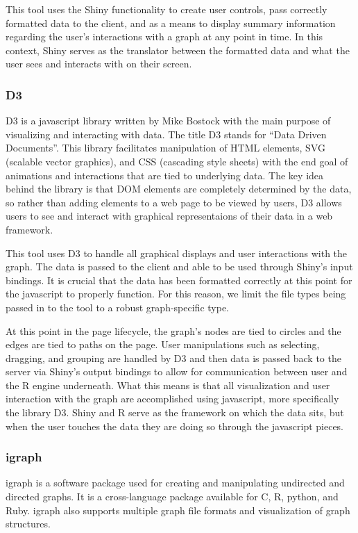 \documentclass{article}\usepackage{graphicx, color}
\begin{document}
This tool uses the Shiny functionality to create user controls, pass correctly formatted data to the client, and as a means to display summary information regarding the user's interactions with a graph at any point in time. In this context, Shiny serves as the translator between the formatted data and what the user sees and interacts with on their screen.


\subsubsection{D3}
D3 is a javascript library written by Mike Bostock with the main purpose of visualizing and interacting with data.\cite{mb-d3} The title D3 stands for ``Data Driven Documents”. This library facilitates manipulation of HTML elements, SVG (scalable vector graphics), and CSS (cascading style sheets) with the end goal of animations and interactions that are tied to underlying data. The key idea behind the library is that DOM elements are completely determined by the data, so rather than adding elements to a web page to be viewed by users, D3 allows users to see and interact with graphical representaions of their data in a web framework. 

This tool uses D3 to handle all graphical displays and user interactions with the graph. The data is passed to the client and able to be used through Shiny's input bindings. It is crucial that the data has been formatted correctly at this point for the javascript to properly function. For this reason, we limit the file types being passed in to the tool to a robust graph-specific type.

At this point in the page lifecycle, the graph's nodes are tied to circles and the edges are tied to paths on the page. User manipulations such as selecting, dragging, and grouping are handled by D3 and then data is passed back to the server via Shiny's output bindings to allow for communication between user and the R engine underneath. What this means is that all visualization and user interaction with the graph are accomplished using javascript, more specifically the library D3. Shiny and R serve as the framework on which the data sits, but when the user touches the data they are doing so through the javascript pieces.


\subsubsection{igraph}
igraph is a software package used for creating and manipulating undirected and directed graphs.\cite{gc-igraph} It is a cross-language package available for C, R, python, and Ruby. igraph also supports multiple graph file formats and visualization of graph structures.
\end{document}
